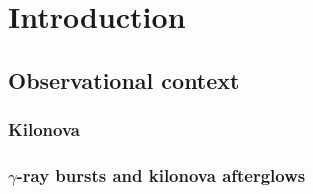 \chapter{Introduction} %

\label{ch:intro} %




\section{Observational context}



\subsection{\rproc{} \nuc{}}\label{sec:nuc:rproc}



\subsection{Kilonova}



\subsection{$\gamma$-ray bursts and kilonova afterglows}


